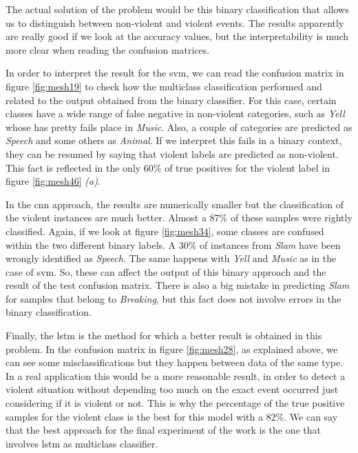 	The actual solution of the problem would be this binary classification that allows us to distinguish between non-violent and violent events. The results apparently are really good if we look at the accuracy values, but the interpretability is much more clear when reading the confusion matrices. 
	
	In order to interpret the result for the \acrshort{svm}, we can read the confusion matrix in figure \ref{fig:mesh19} to check how the multiclass classification performed and related to the output obtained from the binary classifier. For this case, certain classes have a wide range of false negative in non-violent categories, such as \textit{Yell} whose has pretty fails place in \textit{Music}. Also, a couple of categories are predicted as \textit{Speech} and some others as \textit{Animal}. If we interpret this fails in a binary context, they can be resumed by saying that violent labels are predicted as non-violent. This fact is reflected in the only $60\%$ of true positives for the violent label in figure \ref{fig:mesh46} \textit{(a)}. 
	
	In the \acrshort{cnn} approach, the results are numerically smaller but the classification of the violent instances are much better. Almost a $87\%$ of these samples were rightly classified. Again, if we look at figure \ref{fig:mesh34}, some classes are confused within the two different binary labels. A $30\%$ of instances from \textit{Slam} have been wrongly identified as \textit{Speech}. The same happens with \textit{Yell} and \textit{Music} as in the case of \acrshort{svm}. So, these can affect the output of this binary approach and the result of the test confusion matrix. There is also a big mistake in predicting \textit{Slam} for samples that belong to \textit{Breaking}, but this fact does not involve errors in the binary classification.
	
	Finally, the \acrshort{lstm} is the method for which a better result is obtained in this problem. In the confusion matrix in figure \ref{fig:mesh28}, as explained above, we can see some misclassifications but they happen between data of the same type. In a real application this would be a more reasonable result, in order to detect a violent situation without depending too much on the exact event occurred just considering if it is violent or not. This is why the percentage of the true positive samples for the violent class is the best for this model with a $82\%$. We can say that the best approach for the final experiment of the work is the one that involves \acrshort{lstm} as multiclass classifier.
	
	
		
	